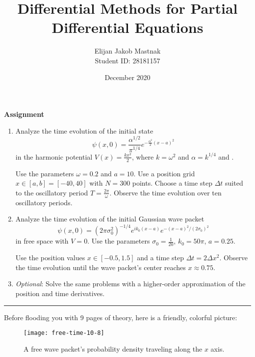 \documentclass[11pt, a4paper]{article}
\begin{document}
\title{Differential Methods for Partial Differential Equations}
\author{Elijan Jakob Mastnak\\[1mm]\small{Student ID: 28181157}}
\date{December 2020}
\maketitle

\tableofcontents

\newpage
\begin{center}
\textbf{Assignment}
\begin{enumerate}
	\item Analyze the time evolution of the initial state
	\begin{equation*}
		\psi(x, 0) = \frac{\alpha^{1/2}}{\pi^{1/4}}e^{-\frac{\alpha^{2}}{2}(x - a)^{2}}
	\end{equation*}
	in the harmonic potential $ V(x) = \frac{kx^{2}}{2} $, where $ k = \omega^{2} $ and $ \alpha = k^{1/4} $ and .
	
	Use the parameters $ \omega = 0.2 $ and $ a = 10 $. Use a position grid $ x \in [a, b] = [-40, 40] $ with $ N = 300 $ points. Choose a time step $ \Delta t $ suited to the oscillatory period $ T = \frac{2\pi}{\omega} $. Observe the time evolution over ten oscillatory periods.
	
	\item Analyze the time evolution of the initial Gaussian wave packet
	\begin{equation*}
		\psi(x, 0) = (2\pi \sigma_{0}^{2})^{-1/4}e^{ik_{0}(x - a)}e^{-(x - a)^{2}/(2\sigma_{0})^{2}}
	\end{equation*}
	in free space with $ V = 0 $. Use the parameters $ \sigma_{0} = \frac{1}{20} $, $ k_{0} = 50 \pi $, $ a = 0.25 $. 
	
	Use the position values $ x \in  [-0.5, 1.5] $ and a time step $ \Delta t = 2 \Delta x^{2} $. Observe the time evolution until the wave packet's center reaches $ x \approx 0.75 $. 
	
	
	\item \textit{Optional}: Solve the same problems with a higher-order approximation of the position and time derivatives.
\end{enumerate}
\end{center}

\rule{\textwidth}{0.2pt} 
\vspace{3mm}

Before flooding you with 9 pages of theory, here is a friendly, colorful picture:
\begin{figure}[htb!]
\centering
\texttt{[image: free-time-10-8]}
\caption{A free wave packet's probability density traveling along the $ x $ axis.}
\label{diff:fig:intro}
\end{figure}
\end{document}
